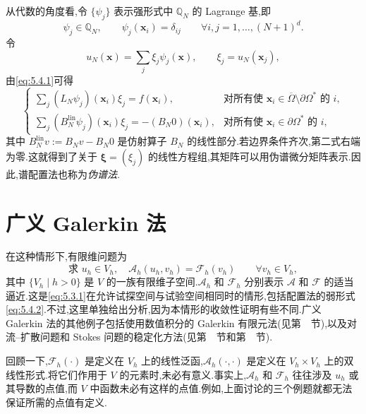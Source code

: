 从代数的角度看,令 \(\{\psi_j\}\) 表示强形式中 \(\mathbb Q_N\) 的 Lagrange 基,即
\begin{equation}\label{eq:5.4.3}
  \psi_j\in\mathbb Q_N,\qquad \psi_j(\boldsymbol{x}_i)=\delta_{ij}
    \qquad\forall i,j=1,\ldots,(N+1)^d.
\end{equation}
令
\[
  u_N(\boldsymbol{x})=\sum_j\xi_j\psi_j(\boldsymbol{x}),\qquad
  \xi_j=u_N(\boldsymbol{x}_j),
\]
由\eqref{eq:5.4.1}可得
\begin{equation}\label{eq:5.4.4}
  \begin{cases}
    \displaystyle\sum_j(L_N\psi_j)(\boldsymbol{x}_i)\xi_j=f(\boldsymbol{x}_i),
        &\text{对所有使 \(\boldsymbol{x}_i\in\overline\Omega\setminus\partial\Omega^*\) 的 \(i\)},\\[3pt]
    \displaystyle\sum_j(B_N^{\mathrm{lin}}\psi_j)(\boldsymbol{x}_i)\xi_j
         =-(B_N0)(\boldsymbol{x}_i),
        &\text{对所有使 \(\boldsymbol{x}_i\in\partial\Omega^*\) 的 \(i\)},
  \end{cases}
\end{equation}
其中 \(B_N^{\mathrm{lin}}v:=B_Nv-B_N0\) 是仿射算子 \(B_N\) 的线性部分.若边界条件齐次,第二式右端为零.这就得到了关于 \(\boldsymbol{\xi}=(\xi_j)\) 的线性方程组,其矩阵可以用伪谱微分矩阵表示.因此,谱配置法也称为\emph{伪谱法}.

\section{广义 Galerkin 法}\label{sec:5.5}

在这种情形下,有限维问题为
\begin{equation}\label{eq:5.5.1}
  \text{求 }u_h\in V_h,\quad
  \mathcal A_h(u_h,v_h)=\mathcal F_h(v_h)\qquad\forall v_h\in V_h,
\end{equation}
其中 \(\{V_h\mid h>0\}\) 是 \(V\) 的一族有限维子空间.\(\mathcal A_h\) 和 \(\mathcal F_h\) 分别表示 \(\mathcal A\) 和 \(\mathcal F\) 的适当逼近.这是\eqref{eq:5.3.1}在允许试探空间与试验空间相同时的情形,包括配置法的弱形式\eqref{eq:5.4.2}.不过,这里单独给出分析,因为本情形的收敛性证明有些不同.广义 Galerkin 法的其他例子包括使用数值积分的 Galerkin 有限元法(见第~~节),以及对流--扩散问题和 Stokes 问题的稳定化方法(见第~~节和第~~节).

回顾一下,\(\mathcal F_h(\cdot)\) 是定义在 \(V_h\) 上的线性泛函,\(\mathcal A_h(\cdot,\cdot)\) 是定义在 \(V_h\times V_h\) 上的双线性形式.将它们作用于 \(V\) 的元素时,未必有意义.事实上,\(\mathcal A_h\) 和 \(\mathcal F_h\) 往往涉及 \(u_h\) 或其导数的点值,而 \(V\) 中函数未必有这样的点值.例如,上面讨论的三个例题就都无法保证所需的点值有定义.

